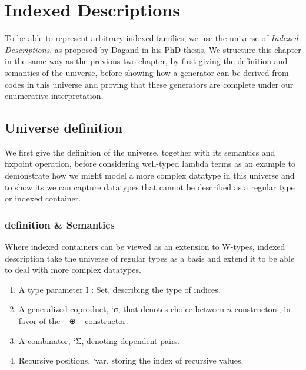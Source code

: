 \documentclass[a4paper,msc,twosized=semi]{uustthesis}
\let\oldemph\emph
\renewcommand\emph[1]{{\large\oldemph{#1}}}
\newcommand{\agda}[1]{{\agdafontinline\color{agdacolor}#1}}
\begin{document}
\chapter{Indexed Descriptions}
To be able to represent arbitrary indexed families, we use the universe of \emph
{Indexed Descriptions}, as proposed by Dagand \cite{dagand2013cosmology} in his PhD 
thesis. We structure this chapter in the same way as the previous two chapter, by 
first giving the definition and semantics of the universe, before showing how a 
generator can be derived from codes in this universe and proving that these generators 
are complete under our enumerative interpretation. 

\section{Universe definition}\label{sec:idescdesc}

  We first give the definition of the universe, together with its semantics and 
  fixpoint operation, before considering well-typed lambda terms as an example to 
  demonstrate how we might model a more complex datatype in this universe and to show its
  we can capture datatypes that cannot be described as a regular type or indexed 
  container. 

\subsection{definition \& Semantics}\label{sec:idescdef}

  Where indexed containers can be viewed as an extension to W-types, indexed 
  description take the universe of regular types as a basis and extend it to be able 
  to deal with more complex datatypes. 

\begin{enumerate}
  \item 
  A type parameter \agda{I : Set}, describing the type of indices.

  \item 
  A generalized coproduct, \agda{`σ}, that denotes choice between $n$ constructors, 
  in favor of the \agda{\_⊕\_} constructor. 

  \item 
  A combinator, \agda{`Σ}, denoting dependent pairs. 

  \item 
  Recursive positions, \agda{`var}, storing the index of recursive values. 
\end{enumerate}
\end{document}
